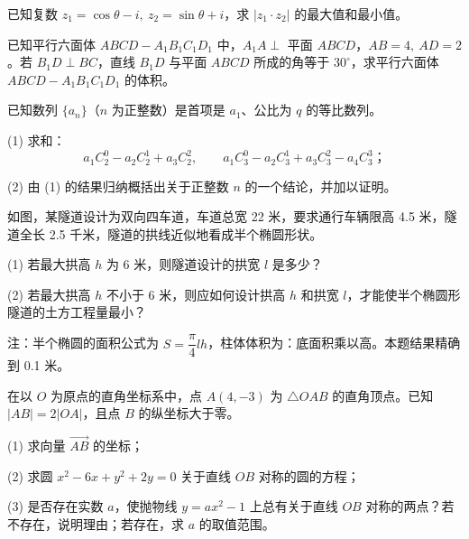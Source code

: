 \begin{question}
已知复数 \(z_1=\cos\theta-i,\ z_2=\sin\theta+i\)，求 \(|z_1\cdot z_2|\) 的最大值和最小值。

\Needspace{0.4\textheight}
\end{question}
\begin{question}
已知平行六面体 \(ABCD-A_1B_1C_1D_1\) 中，\(A_1A\perp\) 平面 \(ABCD\)，\(AB=4,\ AD=2\)。若 \(B_1D\perp BC\)，直线 \(B_1D\) 与平面 \(ABCD\) 所成的角等于 \(30^\circ\)，求平行六面体 \(ABCD-A_1B_1C_1D_1\) 的体积。
\nopagebreak[4]
\begin{center}\end{center}
\nopagebreak[4]
\end{question}
\begin{question}
已知数列 \(\{a_n\}\)（\(n\) 为正整数）是首项是 \(a_1\)、公比为 \(q\) 的等比数列。

    (1) 求和：
\nopagebreak[4]
\[
    a_1C_2^0-a_2C_2^1+a_3C_2^2,\qquad
    a_1C_3^0-a_2C_3^1+a_3C_3^2-a_4C_3^3\text{；}
\]

    (2) 由 (1) 的结果归纳概括出关于正整数 \(n\) 的一个结论，并加以证明。

\Needspace{0.4\textheight}
\end{question}
\begin{question}
如图，某隧道设计为双向四车道，车道总宽 22 米，要求通行车辆限高 4.5 米，隧道全长 2.5 千米，隧道的拱线近似地看成半个椭圆形状。

    (1) 若最大拱高 \(h\) 为 6 米，则隧道设计的拱宽 \(l\) 是多少？

    (2) 若最大拱高 \(h\) 不小于 6 米，则应如何设计拱高 \(h\) 和拱宽 \(l\)，才能使半个椭圆形隧道的土方工程量最小？

    注：半个椭圆的面积公式为 \(S=\dfrac{\pi}{4}lh\)，柱体体积为：底面积乘以高。本题结果精确到 0.1 米。
\nopagebreak[4]
\begin{center}\end{center}
\nopagebreak[4]
\end{question}
\begin{question}
在以 \(O\) 为原点的直角坐标系中，点 \(A(4,-3)\) 为 \(\triangle OAB\) 的直角顶点。已知 \(|AB|=2|OA|\)，且点 \(B\) 的纵坐标大于零。

    (1) 求向量 \(\overrightarrow{AB}\) 的坐标；

    (2) 求圆 \(x^2-6x+y^2+2y=0\) 关于直线 \(OB\) 对称的圆的方程；

    (3) 是否存在实数 \(a\)，使抛物线 \(y=ax^2-1\) 上总有关于直线 \(OB\) 对称的两点？若不存在，说明理由；若存在，求 \(a\) 的取值范围。

\end{question}
